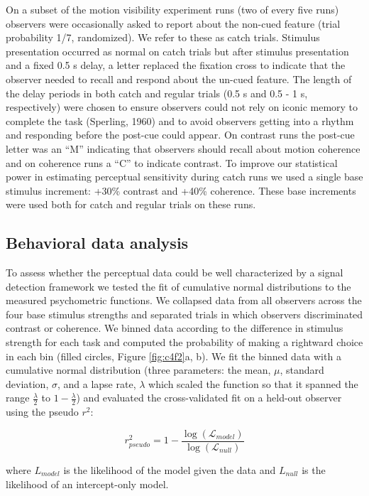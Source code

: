 \documentclass{report}
\begin{document}
On a subset of the motion visibility experiment runs (two of every five runs) observers were occasionally asked to report about the non-cued feature (trial probability 1/7, randomized). We refer to these as catch trials. Stimulus presentation occurred as normal on catch trials but after stimulus presentation and a fixed 0.5 s delay, a letter replaced the fixation cross to indicate that the observer needed to recall and respond about the un-cued feature. The length of the delay periods in both catch and regular trials (0.5 s and 0.5 - 1 s, respectively) were chosen to ensure observers could not rely on iconic memory to complete the task (Sperling, 1960) and to avoid observers getting into a rhythm and responding before the post-cue could appear. On contrast runs the post-cue letter was an “M” indicating that observers should recall about motion coherence and on coherence runs a “C” to indicate contrast. To improve our statistical power in estimating perceptual sensitivity during catch runs we used a single base stimulus increment: +30\% contrast and +40\% coherence. These base increments were used both for catch and regular trials on these runs.

\subsection{Behavioral data analysis}

To assess whether the perceptual data could be well characterized by a signal detection framework we tested the fit of cumulative normal distributions to the measured psychometric functions. We collapsed data from all observers across the four base stimulus strengths and separated trials in which observers discriminated contrast or coherence. We binned data according to the difference in stimulus strength for each task and computed the probability of making a rightward choice in each bin (filled circles, Figure \ref{fig:c4f2}a, b). We fit the binned data with a cumulative normal distribution (three parameters: the mean, $\mu$, standard deviation, $\sigma$, and a lapse rate, $\lambda$ which scaled the function so that it spanned the range $\frac{\lambda}{2}$ to $1-\frac{\lambda}{2}$) and evaluated the cross-validated fit on a held-out observer using the pseudo $r^2$:

\begin{equation}
    r_{pseudo}^2=1 - \frac{\log(\mathcal{L}_{model})}{\log(\mathcal{L}_{null})}
\end{equation}

where $L_{model}$ is the likelihood of the model given the data and $L_{null}$ is the likelihood of an intercept-only model.
\end{document}

